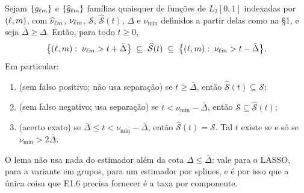 \documentclass[11pt,a4paper]{article}
\newcommand{\ghat}[2]{\widehat{g}_{#1#2}}
\newcommand{\Nhat}[2]{\widehat{\nu}_{#1#2}}
\newcommand{\Ntrue}[2]{\nu_{#1#2}}
\newcommand{\Shat}{\widehat{\mathcal{S}}}
\newcommand{\sepmin}{\nu_{\min}}
\begin{document}
\begin{lemma}
\label{lem:sanduiche}
Sejam $\{g_{\ell m}\}$ e $\{\ghat{\cv}{\md}\}$ famílias quaisquer de
funções de $L_{2}[0,1]$ indexadas por $(\ell,m)$, com $\Nhat{\cv}{\md}$,
$\Ntrue{\cv}{\md}$, $\mathcal{S}$, $\Shat(t)$, $\Delta$ e $\sepmin$ definidos a partir
delas como na §1, e seja $\bar{\Delta} \ge \Delta$. Então, para todo $t \ge 0$,
\begin{equation}
  \label{eq:sanduiche}
  \bigl\{(\cv,\md):\; \Ntrue{\cv}{\md} > t + \bar{\Delta}\bigr\}
  \;\subseteq\; \Shat(t) \;\subseteq\;
  \bigl\{(\cv,\md):\; \Ntrue{\cv}{\md} > t - \bar{\Delta}\bigr\} .
\end{equation}
Em particular:
\begin{enumerate}[label=\textup{(\roman*)}, leftmargin=*, nosep]
  \item \textup{(sem falso positivo; não usa separação)} se $t \ge \bar{\Delta}$, então
    $\Shat(t) \subseteq \mathcal{S}$;
  \item \textup{(sem falso negativo; usa separação)} se $t < \sepmin - \bar{\Delta}$,
    então $\mathcal{S} \subseteq \Shat(t)$;
  \item \textup{(acerto exato)} se $\bar{\Delta} \le t < \sepmin - \bar{\Delta}$, então
    $\Shat(t) = \mathcal{S}$. Tal $t$ existe se e só se $\sepmin > 2\bar{\Delta}$.
\end{enumerate}
\end{lemma}

O lema não usa nada do estimador além da cota $\Delta \le \bar{\Delta}$: vale para o
LASSO, para a variante em grupos, para um estimador por splines, e é por isso
que a única coisa que E1.6 precisa fornecer é a taxa por componente.
\end{document}
